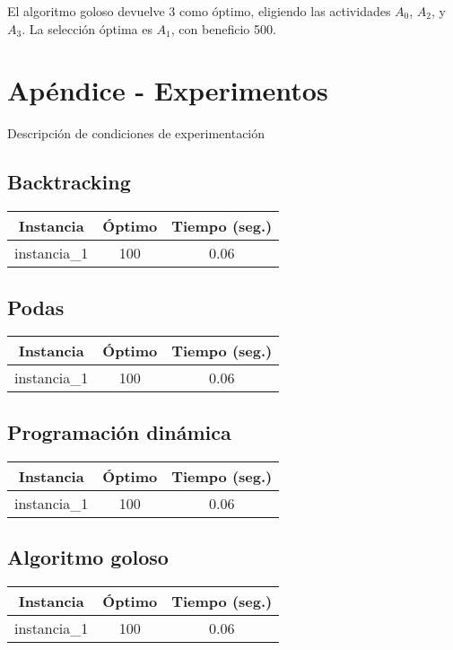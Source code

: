 \documentclass[10pt, a4paper]{article}
\begin{document}
El algoritmo goloso devuelve 3 como óptimo, eligiendo las actividades $A_0$, $A_2$, y $A_3$. La selección óptima es $A_1$, con beneficio 500.

\clearpage

\section*{Apéndice - Experimentos}
Descripción de condiciones de experimentación

\subsection{Backtracking}

\begin{center}
\begin{tabular}{ c c c } 
Instancia & Óptimo & Tiempo (seg.) \\
\hline
instancia\_1 & 100 & 0.06
\end{tabular}
\end{center}


\subsection{Podas}

\begin{center}
\begin{tabular}{ c c c } 
Instancia & Óptimo & Tiempo (seg.) \\
\hline
instancia\_1 & 100 & 0.06
\end{tabular}
\end{center}

\subsection{Programación dinámica}

\begin{center}
\begin{tabular}{ c c c } 
Instancia & Óptimo & Tiempo (seg.) \\
\hline
instancia\_1 & 100 & 0.06
\end{tabular}
\end{center}

\subsection{Algoritmo goloso}

\begin{center}
\begin{tabular}{ c c c } 
Instancia & Óptimo & Tiempo (seg.) \\
\hline
instancia\_1 & 100 & 0.06
\end{tabular}
\end{center}
\end{document}
